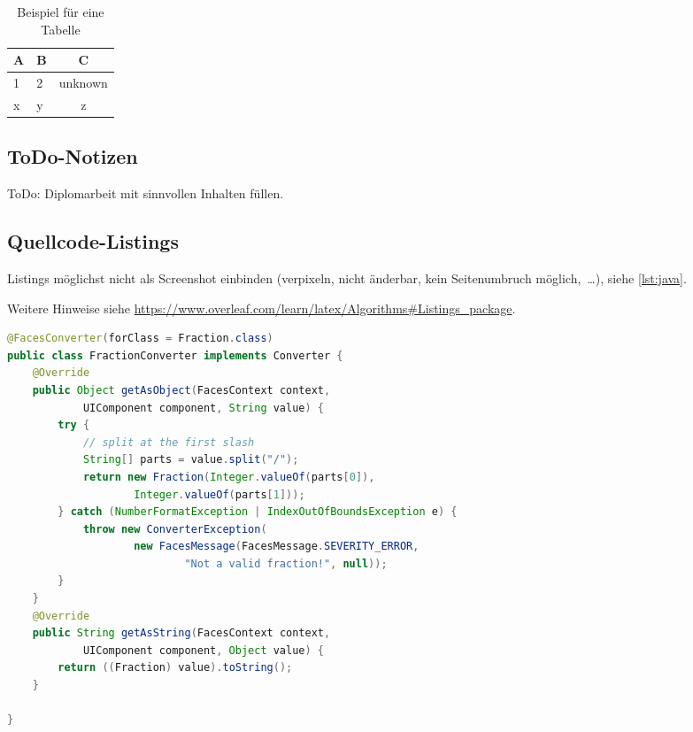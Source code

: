 \begin{table}
	\centering
	\caption{Beispiel für eine Tabelle}
	\label{tab:example}
	\begin{tabular}{llc}
	\toprule
	A & B & C\\
	\midrule
	1 & 2 & unknown\\
	x & y & z\\
	\bottomrule
	\end{tabular}
\end{table}

\subsection{ToDo-Notizen}

\begin{todobox}
ToDo: Diplomarbeit mit sinnvollen Inhalten füllen. 
\end{todobox}

\subsection{Quellcode-Listings}

Listings möglichst nicht als Screenshot einbinden (verpixeln, nicht änderbar, kein Seitenumbruch möglich,~\ldots), siehe \autoref{lst:java}. 

Weitere Hinweise siehe \zB \url{https://www.overleaf.com/learn/latex/Algorithms#Listings_package}. 

\begin{lstlisting}[style=text,language=Java,label=lst:java,caption={Java Code Example}]
@FacesConverter(forClass = Fraction.class)
public class FractionConverter implements Converter {
    @Override
    public Object getAsObject(FacesContext context,
            UIComponent component, String value) {
        try {
            // split at the first slash
            String[] parts = value.split("/");
            return new Fraction(Integer.valueOf(parts[0]),
                    Integer.valueOf(parts[1]));
        } catch (NumberFormatException | IndexOutOfBoundsException e) {
            throw new ConverterException(
                    new FacesMessage(FacesMessage.SEVERITY_ERROR,
                            "Not a valid fraction!", null));
        }
    }
    @Override
    public String getAsString(FacesContext context,
            UIComponent component, Object value) {
        return ((Fraction) value).toString();
    }

}
\end{lstlisting}
